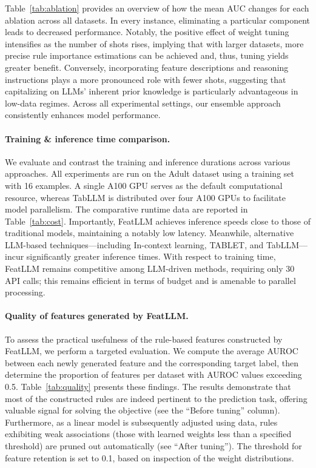 Table~\ref{tab:ablation} provides an overview of how the mean AUC changes for each ablation across all datasets. In every instance, eliminating a particular component leads to decreased performance. Notably, the positive effect of weight tuning intensifies as the number of shots rises, implying that with larger datasets, more precise rule importance estimations can be achieved and, thus, tuning yields greater benefit. Conversely, incorporating feature descriptions and reasoning instructions plays a more pronounced role with fewer shots, suggesting that capitalizing on LLMs' inherent prior knowledge is particularly advantageous in low-data regimes. Across all experimental settings, our ensemble approach consistently enhances model performance.

\vspace*{-0.12in}
\paragraph{Training \& inference time comparison.} We evaluate and contrast the training and inference durations across various approaches. All experiments are run on the Adult dataset using a training set with 16 examples. A single A100 GPU serves as the default computational resource, whereas TabLLM is distributed over four A100 GPUs to facilitate model parallelism. The comparative runtime data are reported in Table~\ref{tab:cost}. Importantly, \textsf{FeatLLM} achieves inference speeds close to those of traditional models, maintaining a notably low latency. Meanwhile, alternative LLM-based techniques—including In-context learning, TABLET, and TabLLM—incur significantly greater inference times. With respect to training time, \textsf{FeatLLM} remains competitive among LLM-driven methods, requiring only 30 API calls; this remains efficient in terms of budget and is amenable to parallel processing. 

\vspace*{-0.12in}
\paragraph{Quality of features generated by \textsf{FeatLLM}.}
To assess the practical usefulness of the rule-based features constructed by \textsf{FeatLLM}, we perform a targeted evaluation. We compute the average AUROC between each newly generated feature and the corresponding target label, then determine the proportion of features per dataset with AUROC values exceeding 0.5. Table~\ref{tab:quality} presents these findings. The results demonstrate that most of the constructed rules are indeed pertinent to the prediction task, offering valuable signal for solving the objective (see the ``Before tuning'' column). Furthermore, as a linear model is subsequently adjusted using data, rules exhibiting weak associations (those with learned weights less than a specified threshold) are pruned out automatically (see ``After tuning''). The threshold for feature retention is set to 0.1, based on inspection of the weight distributions.

